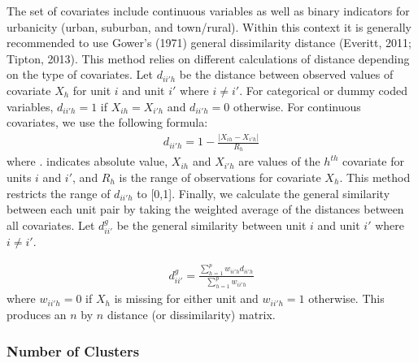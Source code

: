 \documentclass[man,floatsintext]{apa6}
\begin{document}
The set of covariates include continuous variables as well as binary indicators for urbanicity (urban, suburban, and town/rural). Within this context it is generally recommended to use Gower's (1971) general dissimilarity distance (Everitt, 2011; Tipton, 2013). This method relies on different calculations of distance depending on the type of covariates. Let \(d_{ii'h}\) be the distance between observed values of covariate \(X_{h}\) for unit \(i\) and unit \(i'\) where \(i \ne i'\). For categorical or dummy coded variables, \(d_{ii'h} = 1\) if \(X_{ih} = X_{i'h}\) and \(d_{ii'h} = 0\) otherwise. For continuous covariates, we use the following formula:
\begin{align}
  d_{ii'h} = 1 - \frac{|X_{ih} - X_{i'h}|}{R_h}
\end{align}
where \textbar{}.\textbar{} indicates absolute value, \(X_{ih}\) and \(X_{i'h}\) are values of the \(h^{th}\) covariate for units \(i\) and \(i'\), and \(R_h\) is the range of observations for covariate \(X_h\). This method restricts the range of \(d_{ii'h}\) to {[}0,1{]}. Finally, we calculate the general similarity between each unit pair by taking the weighted average of the distances between all covariates. Let \(d^{g}_{ii'}\) be the general similarity between unit \(i\) and unit \(i'\) where \(i \ne i'\).

\begin{align}
  d^{g}_{ii'} = \frac{\sum^p_{h = 1}w_{ii'h}d_{ii'h}}{\sum^p_{h = 1}w_{ii'h}}
\end{align}
where \(w_{ii'h} = 0\) if \(X_h\) is missing for either unit and \(w_{ii'h} = 1\) otherwise. This produces an \(n\) by \(n\) distance (or dissimilarity) matrix.

\hypertarget{number-of-clusters}{%
\subsubsection{Number of Clusters}\label{number-of-clusters}}
\end{document}
